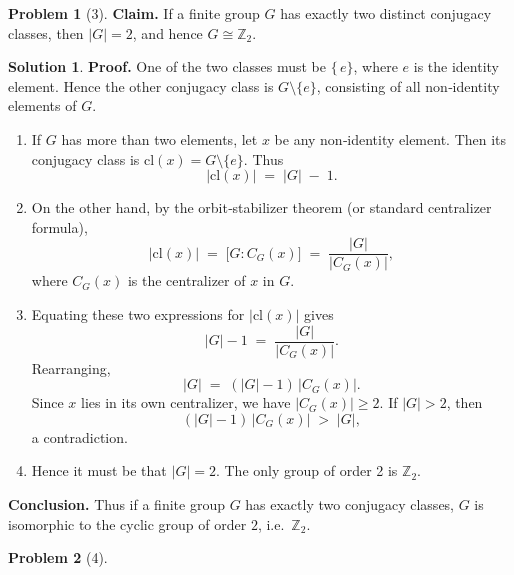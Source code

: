 \documentclass[12pt]{article}
\theoremstyle{definition} %
\newtheorem{solution}{Solution}
\newtheorem{problem}{Problem}
\theoremstyle{plain} %
\begin{document}
\begin{problem}[3]
    \textbf{Claim.} If a finite group $G$ has exactly two distinct conjugacy classes, then $\lvert G\rvert = 2$, and hence $G \cong \mathbb{Z}_2$.

\end{problem}
\begin{solution}

\medskip

\noindent
\textbf{Proof.}
One of the two classes must be $\{\,e\}$, where $e$ is the identity element. Hence the other conjugacy class is $G \setminus \{e\}$, consisting of all non‐identity elements of $G$.

\begin{enumerate}
\item[(1)] If $G$ has more than two elements, let $x$ be any non‐identity element. Then its conjugacy class is $\mathrm{cl}(x) = G \setminus \{e\}$. Thus
\[
\lvert \mathrm{cl}(x)\rvert \;=\; \lvert G \rvert \;-\; 1.
\]

\item[(2)] On the other hand, by the orbit‐stabilizer theorem (or standard centralizer formula),
\[
\lvert \mathrm{cl}(x)\rvert \;=\; \bigl[G : C_G(x)\bigr]
\;=\;
\frac{\lvert G\rvert}{\lvert C_G(x)\rvert},
\]
where $C_G(x)$ is the centralizer of $x$ in $G$.

\item[(3)] Equating these two expressions for $\lvert \mathrm{cl}(x)\rvert$ gives
\[
\lvert G\rvert - 1
\;=\;
\frac{\lvert G\rvert}{\lvert C_G(x)\rvert}.
\]
Rearranging,
\[
\lvert G\rvert
\;=\;
(\lvert G\rvert - 1)\,\lvert C_G(x)\rvert.
\]
Since $x$ lies in its own centralizer, we have $\lvert C_G(x)\rvert \ge 2$. If $\lvert G\rvert > 2$, then
\[
(\lvert G\rvert -1)\,\lvert C_G(x)\rvert
\;>\;
\lvert G\rvert,
\]
a contradiction.

\item[(4)] Hence it must be that $\lvert G\rvert = 2$. The only group of order 2 is $\mathbb{Z}_2$.

\end{enumerate}

\noindent
\textbf{Conclusion.} Thus if a finite group $G$ has exactly two conjugacy classes, $G$ is isomorphic to the cyclic group of order $2$, i.e.\ $\mathbb{Z}_2$.

\end{solution}
\begin{problem}[4]
    
\end{problem}
\end{document}
